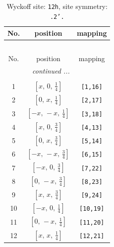 \documentclass[fleqn,8pt]{jsarticle}
\begin{document}
\begin{longtable}{ccc}
\caption{Wyckoff site: {\tt 12h}, site symmetry: {\tt .2'.}}
 \\
 \hline \hline
No. & position & mapping \\ \hline \endfirsthead

\multicolumn{2}{l}{\tablename\ \thetable{}} \\
 \hline \hline
No. & position & mapping \\ \hline \endhead

 \hline \hline
\multicolumn{2}{r}{\footnotesize\it continued ...} \\ \endfoot

 \hline \hline
\multicolumn{2}{r}{} \\ \endlastfoot

1 & $\left[ x,\, 0,\, \frac{1}{4} \right]$ & {\tt [1,16]} \\ \hline
2 & $\left[ 0,\, x,\, \frac{1}{4} \right]$ & {\tt [2,17]} \\ \hline
3 & $\left[ - x,\, - x,\, \frac{1}{4} \right]$ & {\tt [3,18]} \\ \hline
4 & $\left[ x,\, 0,\, \frac{3}{4} \right]$ & {\tt [4,13]} \\ \hline
5 & $\left[ 0,\, x,\, \frac{3}{4} \right]$ & {\tt [5,14]} \\ \hline
6 & $\left[ - x,\, - x,\, \frac{3}{4} \right]$ & {\tt [6,15]} \\ \hline
7 & $\left[ - x,\, 0,\, \frac{3}{4} \right]$ & {\tt [7,22]} \\ \hline
8 & $\left[ 0,\, - x,\, \frac{3}{4} \right]$ & {\tt [8,23]} \\ \hline
9 & $\left[ x,\, x,\, \frac{3}{4} \right]$ & {\tt [9,24]} \\ \hline
10 & $\left[ - x,\, 0,\, \frac{1}{4} \right]$ & {\tt [10,19]} \\ \hline
11 & $\left[ 0,\, - x,\, \frac{1}{4} \right]$ & {\tt [11,20]} \\ \hline
12 & $\left[ x,\, x,\, \frac{1}{4} \right]$ & {\tt [12,21]} \\
\end{longtable}
\renewcommand{\arraystretch}{1.2}
\end{document}
